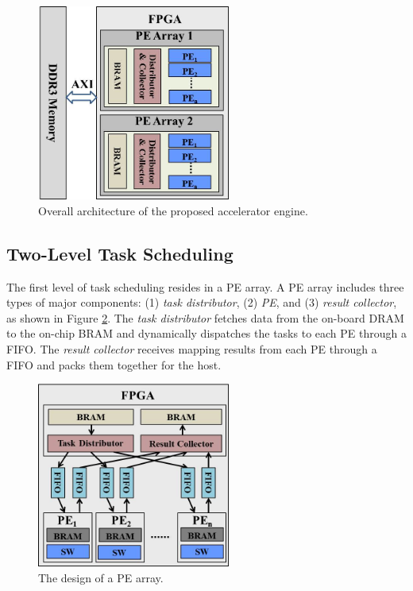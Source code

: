 \begin{figure}[!hbt]
\begin{center}
\includegraphics[width=2.5in]{Figures/Figure_Arch1.jpg}
\caption {Overall architecture of the proposed accelerator engine.} \label{fig:overall_architecture} \end{center} \end{figure}
\vspace{-10pt}

\subsection{Two-Level Task Scheduling}

The first level of task scheduling resides in a PE array. 
A PE array includes three types of major components: (1) \textit{task distributor}, (2) \textit{PE}, and (3) \textit{result collector}, 
as shown in Figure \ref{fig:schedule_structure}.
The \textit{task distributor} fetches data from the on-board DRAM to the on-chip BRAM and dynamically dispatches the tasks to each PE through a FIFO.
The \textit{result collector} receives mapping results from each PE through a FIFO and packs them together for the host.

\begin{figure}[!hbt]
\begin{center}
\includegraphics[width=2.5in]{Figures/Figure_Arch2.jpg}
\caption {The design of a PE array.} \label{fig:schedule_structure} \end{center} \end{figure}
\vspace{-10pt}


